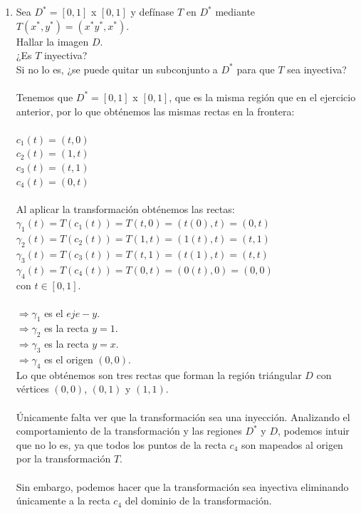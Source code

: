 \documentclass[10pt,letterpaper,fleqn]{article}
\begin{document}
\begin{enumerate}
        \item Sea $D^* = [0,1]$ x $[0, 1]$ y defínase $T$ en $D^*$ mediante $T(x^*, y^*) = (x^*y^*, x^*).$\\
        Hallar la imagen $D$.\\
        ¿Es $T$ inyectiva?\\
        Si no lo es, ¿se puede quitar un subconjunto a $D^*$ para que $T$ sea inyectiva?\\\\
        Tenemos que $D^* = [0,1]$ x $[0, 1]$, que es la misma región que en el ejercicio anterior, por lo que obténemos las mismas rectas en la frontera:\\\\
        $c_1(t) = (t, 0)$\\
        $c_2(t) = (1, t)$\\
        $c_3(t) = (t, 1)$\\
        $c_4(t) = (0, t)$\\\\
        Al aplicar la transformación obténemos las rectas:\\
        $\gamma_1(t) = T(c_1(t)) = T(t, 0) = (t(0), t) = (0, t)$\\
        $\gamma_2(t) = T(c_2(t)) = T(1, t) = (1(t), t) = (t, 1)$\\
		$\gamma_3(t) = T(c_3(t)) = T(t, 1) = (t(1), t) = (t, t)$\\        
        $\gamma_4(t) = T(c_4(t)) = T(0, t) = (0(t), 0) = (0, 0)$\\
        con $t \in [0,1]$.\\\\
        $\Rightarrow \gamma_1$ es el $eje-y$.\\
        $\Rightarrow \gamma_2$ es la recta $y = 1$.\\
        $\Rightarrow \gamma_3$ es la recta $y = x$.\\
        $\Rightarrow \gamma_4$ es el origen $(0, 0)$.\\
        Lo que obténemos son tres rectas que forman la región triángular $D$ con vértices $(0,0)$, $(0,1)$ y $(1, 1)$.\\\\   
        Únicamente falta ver que la transformación sea una inyección. Analizando el comportamiento de la transformación y las regiones $D^*$ y $D$, podemos intuir que no lo es, ya que todos los puntos de la recta $c_4$ son mapeados al origen por la transformación $T$.\\\\
        Sin embargo, podemos hacer que la transformación sea inyectiva eliminando únicamente a la recta $c_4$ del dominio de la transformación.\\\\           


\end{enumerate}
\end{document}
